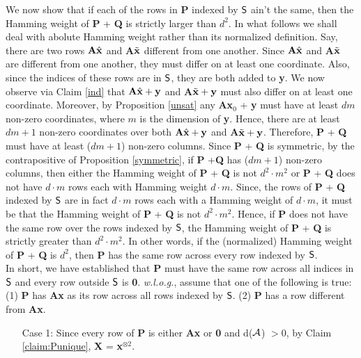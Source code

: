 {\noindent We now show that if each of the rows in {\bf P} indexed by ${\sf S}$ ain't the 
same, then the Hamming weight of {\bf P} + {\bf Q} is strictly larger than $d^2$. In what follows
we shall deal with abolute Hamming weight rather than its normalized definition. Say, there are two rows ${\bf A}\hat{\bf
    x}$ and {\bf A}$\tilde{\bf x}$ different from one another. Since 
${\bf A}\hat{\bf  x}$ and {\bf A}$\tilde{\bf x}$ are different from one another, they must differ on at least one coordinate.
Also, since the indices of these rows are in ${\sf S}$, they are both added to {\bf y}.
We now observe via Claim \ref{ind} that ${\bf A}\hat{\bf
    x} + {\bf y}$ and {\bf A}$\tilde{\bf x} + {\bf y}$ must also
  differ on at least one coordinate. Moreover, by Proposition
  \ref{unsat} any {\bf Ax$_0$} + {\bf y} must have at least $dm$ non-zero
  coordinates, where $m$ is the dimension of {\bf y}. Hence, there are 
at least $dm + 1$ non-zero coordinates over
  both ${\bf A}\hat{\bf x} + {\bf y}$ and {\bf A}$\tilde{\bf x} + {\bf
    y}$. Therefore, {\bf P} + {\bf Q} must have at least
  ($dm + 1$) non-zero columns. Since {\bf P} + {\bf Q} is symmetric, by 
the contrapositive of Proposition \ref{symmetric}, if {\bf P} +{\bf Q}
has ($dm + 1$) non-zero columns, then either the Hamming weight of {\bf P} + {\bf Q} 
is not $d^2 \cdot m^2$ or {\bf P} + {\bf Q} does not have $d \cdot m$ rows each with 
Hamming weight $d \cdot m$. Since, the rows of {\bf P} + {\bf Q} indexed by ${\sf S}$ are in fact 
$d \cdot m$ rows each with a Hamming weight of $d \cdot m$, it must be that 
the Hamming weight of {\bf P} + {\bf Q} is not $d^2 \cdot m^2$. Hence, if {\bf P} does 
not have the same row over the rows indexed by ${\sf S}$, the Hamming weight of 
  {\bf P} + {\bf Q} is strictly greater than $d^2 \cdot m^2$. In other words, if the
(normalized) Hamming weight of {\bf P} + {\bf Q} is $d^2$, then {\bf P} has the 
same row across every row indexed by ${\sf S}$.  \\


\noindent In short, we have established that {\bf P} must have the same row across
all indices in ${\sf S}$ and every row outside ${\sf S}$ is {\bf 0}. {\em w.l.o.g.}, assume that one of the following is true: 
(1) {\bf P} has {\bf Ax} as its row across all rows indexed by ${\sf S}$. (2)
{\bf P} has a row different from {\bf Ax}.

\begin{enumerate}
\item [Case 1:] Since every row of {\bf P} is either {\bf Ax} or {\bf 0}
and d(${\cal A}$) $> 0$, by Claim \ref{claim:Punique}, {\bf X} = {\bf x}$^{\otimes
  2}$. 
 

\end{enumerate}}
